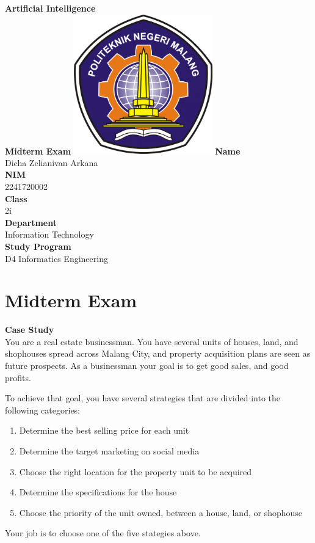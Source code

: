 \documentclass[12pt,titlepage]{article}
\newcommand{\vSubject}{Artificial Intelligence}
\newcommand{\vSubtitle}{Midterm Exam}
\newcommand{\vName}{Dicha Zelianivan Arkana}
\newcommand{\vNIM}{2241720002}
\newcommand{\vClass}{2i}
\newcommand{\vDepartment}{Information Technology}
\newcommand{\vStudyProgram}{D4 Informatics Engineering}
\begin{document}
\begin{titlepage}
    \centering
    \vfill
    {\bfseries\LARGE
        \vSubject\\
        \vskip0.25cm
        \vSubtitle
    }
    \vfill
    \includegraphics[width=6cm]{images/polinema-logo.png}
    \vfill
    {
        \textbf{Name}\\
        \vName\\
        \vskip0.5cm
        \textbf{NIM}\\
        \vNIM\\
        \vskip0.5cm
        \textbf{Class}\\
        \vClass\\
        \vskip0.5cm
        \textbf{Department}\\
        \vDepartment\\
        \vskip0.5cm
        \textbf{Study Program}\\
        \vStudyProgram
    }
\end{titlepage}

\section{Midterm Exam}

\large{\textbf{Case Study}}\\
You are a real estate businessman. You have several units of houses, land, and shophouses spread across Malang City, and property acquisition plans are seen
as future prospects. As a businessman your goal is to get good sales, and good profits.

To achieve that goal, you have several strategies that are divided into the following categories:
\begin{enumerate}
    \item Determine the best selling price for each unit
    \item Determine the target marketing on social media
    \item Choose the right location for the property unit to be acquired
    \item Determine the specifications for the house
    \item Choose the priority of the unit owned, between a house, land, or shophouse
\end{enumerate}
Your job is to choose one of the five stategies above.
\end{document}
